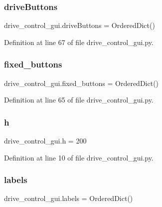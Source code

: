 \subsubsection{\texorpdfstring{drive\+Buttons}{driveButtons}}
{\footnotesize\ttfamily drive\+\_\+control\+\_\+gui.\+drive\+Buttons = Ordered\+Dict()}



Definition at line 67 of file drive\+\_\+control\+\_\+gui.\+py.

\mbox{\label{namespacedrive__control__gui_a6d8c80f6cfe16c1a434f16b00330c3d2}} 
\subsubsection{\texorpdfstring{fixed\+\_\+buttons}{fixed\_buttons}}
{\footnotesize\ttfamily drive\+\_\+control\+\_\+gui.\+fixed\+\_\+buttons = Ordered\+Dict()}



Definition at line 65 of file drive\+\_\+control\+\_\+gui.\+py.

\mbox{\label{namespacedrive__control__gui_a015e1fad080e1b240918bda96eeb0c3c}} 
\subsubsection{\texorpdfstring{h}{h}}
{\footnotesize\ttfamily drive\+\_\+control\+\_\+gui.\+h = 200}



Definition at line 10 of file drive\+\_\+control\+\_\+gui.\+py.

\mbox{\label{namespacedrive__control__gui_a84069fee7713a950aef3ac43e08a8efd}} 
\subsubsection{\texorpdfstring{labels}{labels}}
{\footnotesize\ttfamily drive\+\_\+control\+\_\+gui.\+labels = Ordered\+Dict()}




